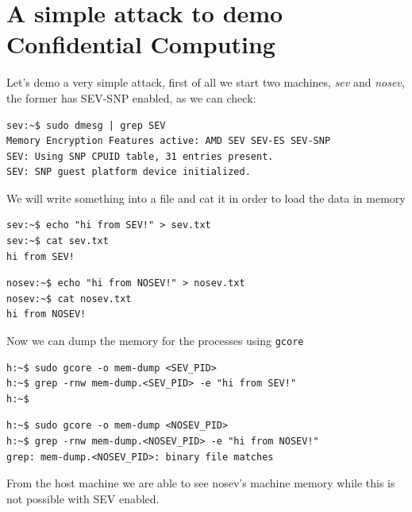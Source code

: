 \documentclass[twocolumn]{article}
\begin{document}
\section{A simple attack to demo Confidential Computing}
Let's demo a very simple attack, first of all we start two machines, \textit{sev} and \textit{nosev}, the former has SEV-SNP enabled, as we can check:

\begin{verbatim}
sev:~$ sudo dmesg | grep SEV
Memory Encryption Features active: AMD SEV SEV-ES SEV-SNP
SEV: Using SNP CPUID table, 31 entries present.
SEV: SNP guest platform device initialized.
\end{verbatim}

We will write something into a file and cat it in order to load the data in memory

\begin{verbatim}
sev:~$ echo "hi from SEV!" > sev.txt
sev:~$ cat sev.txt
hi from SEV!
\end{verbatim}

\begin{verbatim}
nosev:~$ echo "hi from NOSEV!" > nosev.txt
nosev:~$ cat nosev.txt
hi from NOSEV!
\end{verbatim}

Now we can dump the memory for the processes using \texttt{gcore}

\begin{verbatim}
h:~$ sudo gcore -o mem-dump <SEV_PID>
h:~$ grep -rnw mem-dump.<SEV_PID> -e "hi from SEV!"
h:~$
\end{verbatim}

\begin{verbatim}
h:~$ sudo gcore -o mem-dump <NOSEV_PID>
h:~$ grep -rnw mem-dump.<NOSEV_PID> -e "hi from NOSEV!"
grep: mem-dump.<NOSEV_PID>: binary file matches
\end{verbatim}

From the host machine we are able to see nosev's machine memory while this is not possible with SEV enabled.
\end{document}
